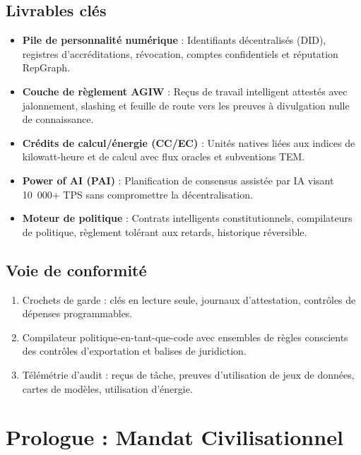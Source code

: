\documentclass[11pt]{article}
\begin{document}
\subsection{Livrables clés}
\begin{itemize}[noitemsep]
  \item \textbf{Pile de personnalité numérique} : Identifiants décentralisés (DID), registres d'accréditations, révocation, comptes confidentiels et réputation RepGraph.
  \item \textbf{Couche de règlement AGIW} : Reçus de travail intelligent attestés avec jalonnement, slashing et feuille de route vers les preuves à divulgation nulle de connaissance.
  \item \textbf{Crédits de calcul/énergie (CC/EC)} : Unités natives liées aux indices de kilowatt-heure et de calcul avec flux oracles et subventions TEM.
  \item \textbf{Power of AI (PAI)} : Planification de consensus assistée par IA visant 10~000+ TPS sans compromettre la décentralisation.
  \item \textbf{Moteur de politique} : Contrats intelligents constitutionnels, compilateurs de politique, règlement tolérant aux retards, historique réversible.
\end{itemize}

\subsection{Voie de conformité}
\begin{enumerate}[noitemsep]
  \item Crochets de garde : clés en lecture seule, journaux d'attestation, contrôles de dépenses programmables.
  \item Compilateur politique-en-tant-que-code avec ensembles de règles conscients des contrôles d'exportation et balises de juridiction.
  \item Télémétrie d'audit : reçus de tâche, preuves d'utilisation de jeux de données, cartes de modèles, utilisation d'énergie.
\end{enumerate}

\section{Prologue : Mandat Civilisationnel}
\end{document}
